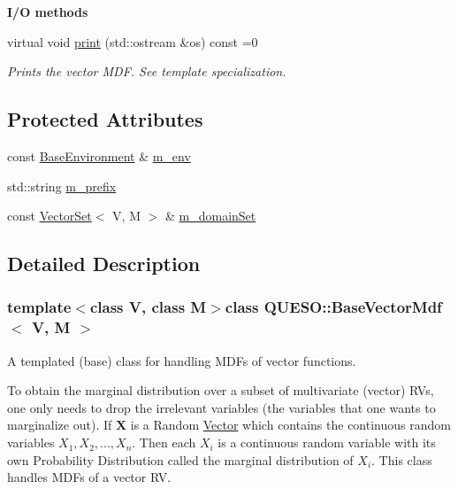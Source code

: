 \begin{Indent}{\bf I/\-O methods}\par
\begin{DoxyCompactItemize}
\item 
virtual void \hyperlink{class_q_u_e_s_o_1_1_base_vector_mdf_a8c656209554341cb90f16f867ad9cb37}{print} (std\-::ostream \&os) const =0
\begin{DoxyCompactList}\small\item\em Prints the vector M\-D\-F. See template specialization. \end{DoxyCompactList}\end{DoxyCompactItemize}
\end{Indent}
\subsection*{Protected Attributes}
\begin{DoxyCompactItemize}
\item 
const \hyperlink{class_q_u_e_s_o_1_1_base_environment}{Base\-Environment} \& \hyperlink{class_q_u_e_s_o_1_1_base_vector_mdf_a39fbb4c9b12a0906a6d8c82535c837c7}{m\-\_\-env}
\item 
std\-::string \hyperlink{class_q_u_e_s_o_1_1_base_vector_mdf_ada097dfdcb97838d0bd71a25ed7a4193}{m\-\_\-prefix}
\item 
const \hyperlink{class_q_u_e_s_o_1_1_vector_set}{Vector\-Set}$<$ V, M $>$ \& \hyperlink{class_q_u_e_s_o_1_1_base_vector_mdf_a7f4804e5bb9d5947a4c7659605e8fa3b}{m\-\_\-domain\-Set}
\end{DoxyCompactItemize}


\subsection{Detailed Description}
\subsubsection*{template$<$class V, class M$>$class Q\-U\-E\-S\-O\-::\-Base\-Vector\-Mdf$<$ V, M $>$}

A templated (base) class for handling M\-D\-Fs of vector functions. 

To obtain the marginal distribution over a subset of multivariate (vector) R\-Vs, one only needs to drop the irrelevant variables (the variables that one wants to marginalize out). If {\bfseries X} is a Random \hyperlink{class_q_u_e_s_o_1_1_vector}{Vector} which contains the continuous random variables $ X_1, X_2, ..., X_n $. Then each $ X_i $ is a continuous random variable with its own Probability Distribution called the marginal distribution of $ X_i $. This class handles M\-D\-Fs of a vector R\-V. 

